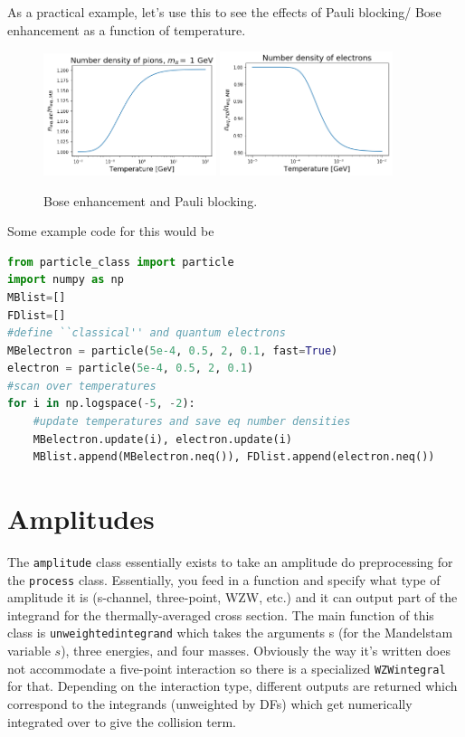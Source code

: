 \documentclass[superscriptaddress,nofootinbib,notitlepage,onecolumn]{revtex4-1}
\newcommand{\code}[1]{\texttt{#1}}
\begin{document}
As a practical example, let's use this to see the effects of Pauli blocking/ Bose enhancement as a function of temperature. 
 \begin{figure}[h!]
\includegraphics[width=0.45\textwidth]{bose.png}
\includegraphics[width=0.45\textwidth]{pauli.png}
\caption{Bose enhancement and Pauli blocking.}
\end{figure}
Some example code for this would be 
\begin{lstlisting}[language=Python]
from particle_class import particle
import numpy as np
MBlist=[] 
FDlist=[]
#define ``classical'' and quantum electrons
MBelectron = particle(5e-4, 0.5, 2, 0.1, fast=True)
electron = particle(5e-4, 0.5, 2, 0.1)
#scan over temperatures
for i in np.logspace(-5, -2):
	#update temperatures and save eq number densities
	MBelectron.update(i), electron.update(i)
	MBlist.append(MBelectron.neq()), FDlist.append(electron.neq())
\end{lstlisting}

\section{Amplitudes}
The \code{amplitude} class essentially exists to take an amplitude do preprocessing for the \code{process} class. Essentially, you feed in a function and specify what type of amplitude it is (s-channel, three-point, WZW, etc.) and it can output part of the integrand for the thermally-averaged cross section. The main function of this class is \code{unweightedintegrand} which takes the arguments s (for the Mandelstam variable $s$), three energies, and four masses. Obviously the way it's written does not accommodate a five-point interaction so there is a specialized \code{WZWintegral} for that. Depending on the interaction type, different outputs are returned which correspond to the integrands (unweighted by DFs) which get numerically integrated over to give the collision term.
\end{document}
